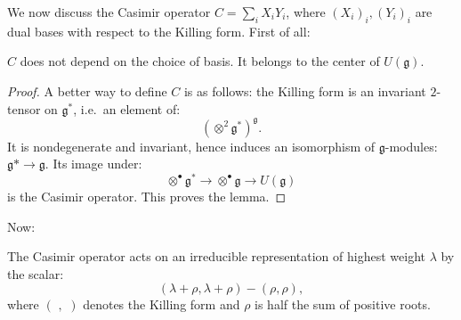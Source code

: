 We now discuss the Casimir operator $C=\sum_i X_i Y_i$, where $(X_i)_i, (Y_i)_i$ are dual bases with respect to the Killing form. First of all:

\begin{lemma}\label{lemmaCasimir}
 $C$ does not depend on the choice of basis. It belongs to the center of $U(\mathfrak g)$.
\end{lemma}

\begin{proof}
 A better way to define $C$ is as follows: the Killing form is an invariant $2$-tensor on $\mathfrak g^*$, i.e.\ an element of:
$$\left(\otimes^2\mathfrak g^*\right)^{\mathfrak g}.$$
It is nondegenerate and invariant, hence induces an isomorphism of $\mathfrak g$-modules: $\mathfrak g*\to \mathfrak g$. Its image under:
$$\otimes^\bullet \mathfrak g^* \to \otimes^\bullet\mathfrak g \to U(\mathfrak g) $$
is the Casimir operator. This proves the lemma.
\end{proof}

Now:
\begin{lemma}
 The Casimir operator acts on an irreducible representation of highest weight $\lambda$ by the scalar:
$$(\lambda+\rho,\lambda+\rho)-(\rho,\rho),$$
where $(\,\, , \,\,)$ denotes the Killing form and $\rho$ is half the sum of positive roots.
\end{lemma}

